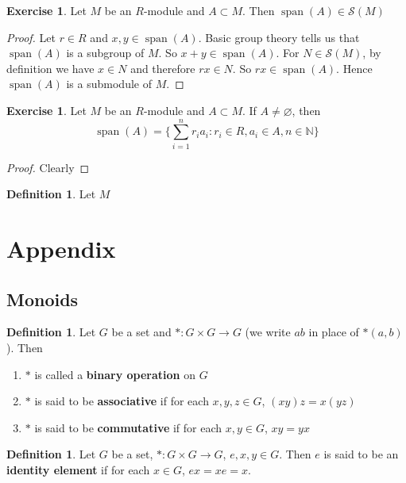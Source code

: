 \documentclass[12pt]{amsart}
\theoremstyle{definition}
\newtheorem{defn}[definition]{Definition}
\theoremstyle{remark}
\theoremstyle{definition}
\newtheorem{ex}[definition]{Exercise}
\newcommand{\N}{\mathbb{N}}
\newcommand{\MS}{\mathcal{S}}
\DeclareMathOperator{\spn}{span}
\begin{document}
	\begin{ex}
	Let $M$ be an $R$-module and $A \subset M$. Then 
	$\spn(A) \in \MS(M)$
	\end{ex}
	
	\begin{proof}
	Let $r \in R$ and $x,y \in \spn(A)$. Basic group theory tells us that $\spn(A)$ is a subgroup of $M$. So $x+y \in \spn(A)$. For $N \in \MS(M)$, by definition we have $x \in N$ and therefore $rx \in N$. So $rx \in \spn(A)$. Hence $\spn(A)$ is a submodule of $M$.
	\end{proof}
	
	\begin{ex}
	Let $M$ be an $R$-module and $A \subset M$. If $A \neq \varnothing$, then $$\spn(A) = \bigg \{\sum\limits_{i=1}^n r_ia_i: r_i \in R, a_i \in A, n \in \N \bigg \}$$
	\end{ex}
	
	\begin{proof}
	Clearly 
	\end{proof}
	
	\begin{defn}
	Let $M$
	\end{defn}
	
	
	
	\section{Appendix}
	\subsection{Monoids}
	
	\begin{defn}
	Let $G$ be a set and $*: G \times G \rightarrow G$ (we write $ab$ in place of $*(a,b)$). Then 
	\begin{enumerate}
	\item $*$ is called a \textbf{binary operation} on $G$	
	\item $*$ is said to be \textbf{associative}	if for each $x,y,z \in G$, $(xy)z = x(yz)$
	\item $*$ is said to be \textbf{commutative} if for each $x,y \in G$, $xy = yx$ 
	\end{enumerate}
	\end{defn}
	
	\begin{defn}
	Let $G$ be a set, $*: G \times G \rightarrow G$, $e,x,y \in G$. Then $e$ is said to be an \textbf{identity element} if for each $x \in G$, $ex = xe = x$.
	\end{defn}
	
\end{document}
